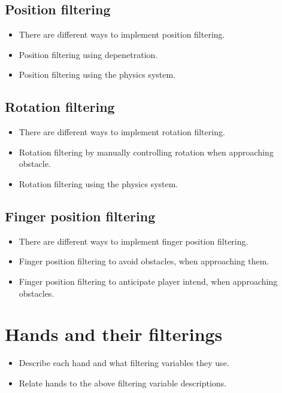 \subsection{Position filtering}
\label{subsec:implementationPositionFiltering}
\begin{itemize}
\item There are different ways to implement position filtering.
\item Position filtering using depenetration.
\item Position filtering using the physics system.
\end{itemize}

\subsection{Rotation filtering}
\label{subsec:implementationRotationFiltering}
\begin{itemize}
\item There are different ways to implement rotation filtering.
\item Rotation filtering by manually controlling rotation when approaching obstacle.
\item Rotation filtering using the physics system.
\end{itemize}

\subsection{Finger position filtering}
\label{subsec:implementationFingerFiltering}
\begin{itemize}
\item There are different ways to implement finger position filtering.
\item Finger position filtering to avoid obstacles, when approaching them.
\item Finger position filtering to anticipate player intend, when approaching obstacles.
\end{itemize}

\section{Hands and their filterings}
\label{sec:LABELABOUTHANDSVERSIONS}
\begin{itemize}
\item Describe each hand and what filtering variables they use.
\item Relate hands to the above filtering variable descriptions.
\end{itemize}

